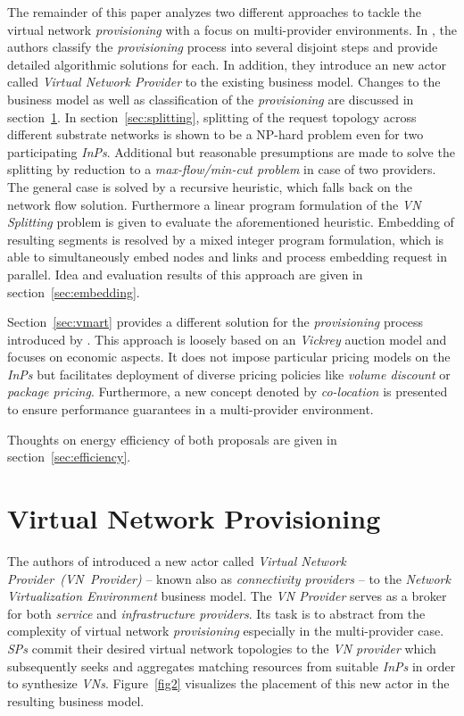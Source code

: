 \documentclass[prodmode,acmtomccap]{acmlarge}
\begin{document}
The remainder of this paper analyzes two different approaches to tackle the virtual network \emph{provisioning} with a focus on multi-provider environments.
In , the authors classify the \emph{provisioning} process into several disjoint steps and provide detailed algorithmic solutions for each.
In addition, they introduce an new actor called \emph{Virtual Network Provider} to the existing business model. Changes to the business model as well as
classification of the \emph{provisioning} are discussed in section~\ref{sec:provisioning}.
In section~\ref{sec:splitting}, splitting of the request topology across different substrate networks is shown to be a NP-hard problem even for two participating \emph{InPs}. 
Additional but reasonable presumptions are made to solve the splitting by reduction to a \emph{max-flow/min-cut problem} in case of two providers.
The general case is solved by a recursive heuristic, which falls back on the network flow solution. Furthermore a linear program formulation of the \emph{VN Splitting} problem
is given to evaluate the aforementioned heuristic.
Embedding of resulting segments is resolved by a mixed integer program formulation, which is able to simultaneously embed nodes and links and process embedding request in parallel.
Idea and evaluation results of this approach are given in section~\ref{sec:embedding}.

Section~\ref{sec:vmart} provides a different solution for the \emph{provisioning} process introduced by .
This approach is loosely based on an \emph{Vickrey} auction model and focuses on economic aspects. It does not impose particular pricing models on the \emph{InPs} but facilitates
deployment of diverse pricing policies like \emph{volume discount} or \emph{package pricing}. Furthermore, a new concept denoted by \emph{co-location} is presented
to ensure performance guarantees in a multi-provider environment.

Thoughts on energy efficiency of both proposals are given in section~\ref{sec:efficiency}.


\section{Virtual Network Provisioning}
\label{sec:provisioning}
The authors of  introduced a new actor called \emph{Virtual Network Provider~(VN~Provider)} -- known also as \emph{connectivity providers} -- 
to the \emph{Network Virtualization Environment} business model. The \emph{VN Provider} serves as a broker for both \emph{service} and \emph{infrastructure providers}.
Its task is to abstract from the complexity of virtual network \emph{provisioning} especially in the multi-provider case. \emph{SPs} commit their desired virtual network topologies
to the \emph{VN provider} which subsequently seeks and aggregates matching resources from suitable \emph{InPs} in order to synthesize \emph{VNs}.
Figure~\ref{fig2} visualizes the placement of this new actor in the resulting business model.
\end{document}
